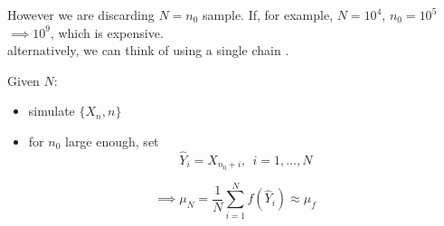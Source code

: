 \documentclass{article}
\begin{document}
However we are discarding  $N=n_0$ sample. If, for example, $N= 10^4$, $n_0= 10^5$ $\implies 10^9$, which is expensive.\\
alternatively, we can think of using a single chain . \\
\begin{algorithm}
   Given $N$:
\begin{itemize}
    \item simulate $\{X_n, n\}$
    \item  for $n_0$ large enough, set 
    \begin{equation*}
        \hat{Y}_i= X_{n_0+i}, \ \ i = 1,\dots,N 
    \end{equation*}
\end{itemize}
\begin{equation*}
    \implies \mu_N = \frac{1}{N}\sum_{i=1}^N f(\hat{Y}_i)\approx \mu_f 
\end{equation*} 
\end{algorithm}
\end{document}
